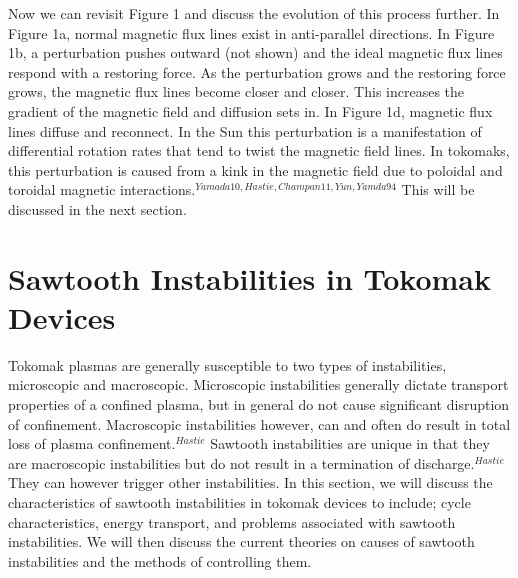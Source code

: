 \documentclass{article}
\begin{document}
Now we can revisit Figure 1 and discuss the evolution of this process further.  In Figure 1a, normal magnetic flux lines exist in anti-parallel directions.  In Figure 1b, a perturbation pushes outward (not shown) and the ideal magnetic flux lines respond with a restoring force.  As the perturbation grows and the restoring force grows, the magnetic flux lines become closer and closer.  This increases the gradient of the magnetic field and diffusion sets in.  In Figure 1d, magnetic flux lines diffuse and reconnect.  In the Sun this perturbation is a manifestation of differential rotation rates that tend to twist the magnetic field lines.  In tokomaks, this perturbation is caused from a kink in the magnetic field due to poloidal and toroidal magnetic interactions.$^{Yamada10,Hastie,Champan11,Yun,Yamda94}$  This will be discussed in the next section.
\section{Sawtooth Instabilities in Tokomak Devices}
Tokomak plasmas are generally susceptible to two types of instabilities, microscopic and macroscopic.  Microscopic instabilities generally dictate transport properties of a confined plasma, but in general do not cause significant disruption of confinement.  Macroscopic instabilities however, can and often do result in total loss of plasma confinement.$^{Hastie}$  Sawtooth instabilities are unique in that they are macroscopic instabilities but do not result in a termination of discharge.$^{Hastie}$  They can however trigger other instabilities.  In this section, we will discuss the characteristics of sawtooth instabilities in tokomak devices to include; cycle characteristics, energy transport, and problems associated with sawtooth instabilities.  We will then discuss the current theories on causes of sawtooth instabilities and the methods of controlling them.
\end{document}
